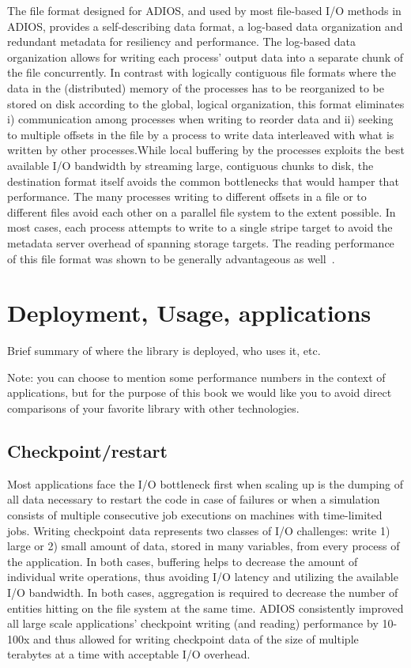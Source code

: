 The file format designed for ADIOS, and used by most file-based I/O methods in ADIOS, provides a
self-describing data format, a log-based data organization and redundant metadata for resiliency and
performance. The log-based data organization allows for writing each process' output data into a
separate chunk of the file concurrently. In contrast with logically contiguous file formats where
the data in the (distributed) memory of the processes has to be reorganized to be stored on disk
according to the global, logical organization, this format eliminates i) communication among
processes when writing to reorder data and ii) seeking to multiple offsets in the file by a process
to write data interleaved with what is written by other processes.While local buffering by the
processes exploits the best available I/O bandwidth by streaming large, contiguous chunks to disk,
the destination format itself avoids the common bottlenecks that would hamper that performance. The
many processes writing to different offsets in a file or to different files avoid each other on a
parallel file system to the extent possible. In most cases, each process attempts to write to a
single stripe target to avoid the metadata server overhead of spanning storage targets. The reading
performance of this file format was shown to be generally advantageous as
well~\cite{ADIOS:Lofstead:hpdc11}.





%
%
\section{Deployment, Usage, applications}
{\color {red}Brief summary of where the library is deployed, who uses it, etc.

Note: you can choose to mention some performance numbers in the context of applications, but for the purpose of this book we would like you to avoid direct comparisons of your favorite library with other technologies.  }


%
%
\subsection{Checkpoint/restart}

Most applications face the I/O bottleneck first when scaling up is the dumping of all data necessary to restart the code in case of failures or when a simulation consists of multiple consecutive job executions on machines with time-limited jobs.  Writing checkpoint data represents two classes of I/O challenges: write 1) large or 2) small amount of data, stored in many variables, from every process of the application. In both cases, buffering helps to decrease the amount of individual write operations, thus avoiding I/O latency and utilizing the available I/O bandwidth. In both cases, aggregation is required to decrease the number of entities hitting on the file system at the same time. ADIOS consistently improved all large scale applications' checkpoint writing (and reading) performance by 10-100x and thus allowed for writing checkpoint data of the size of multiple terabytes at a time with acceptable I/O overhead. 

